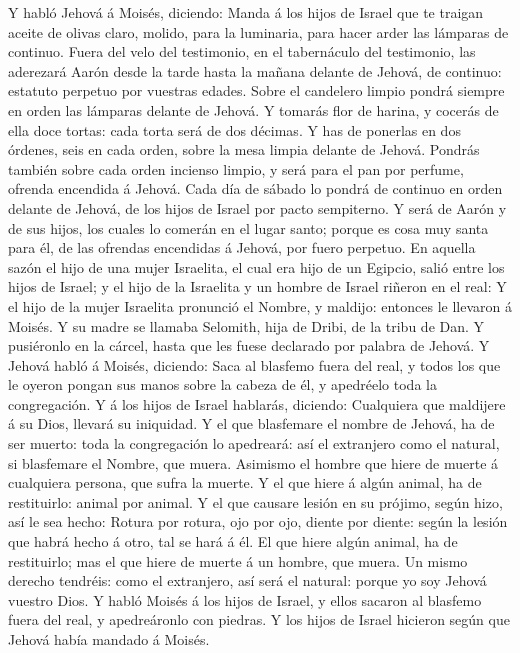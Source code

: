  Y habló Jehová á Moisés, diciendo:  Manda á los
hijos de Israel que te traigan aceite de olivas claro, molido, para la
luminaria, para hacer arder las lámparas de continuo.  Fuera
del velo del testimonio, en el tabernáculo del testimonio, las aderezará
Aarón desde la tarde hasta la mañana delante de Jehová, de continuo:
estatuto perpetuo por vuestras edades.  Sobre el candelero
limpio pondrá siempre en orden las lámparas delante de Jehová.
 Y tomarás flor de harina, y cocerás de ella doce tortas:
cada torta será de dos décimas.  Y has de ponerlas en dos
órdenes, seis en cada orden, sobre la mesa limpia delante de Jehová.
 Pondrás también sobre cada orden incienso limpio, y será
para el pan por perfume, ofrenda encendida á Jehová.  Cada
día de sábado lo pondrá de continuo en orden delante de Jehová, de los
hijos de Israel por pacto sempiterno.  Y será de Aarón y de
sus hijos, los cuales lo comerán en el lugar santo; porque es cosa muy
santa para él, de las ofrendas encendidas á Jehová, por fuero perpetuo.
 En aquella sazón el hijo de una mujer Israelita, el cual
era hijo de un Egipcio, salió entre los hijos de Israel; y el hijo de la
Israelita y un hombre de Israel riñeron en el real:  Y el
hijo de la mujer Israelita pronunció el Nombre, y maldijo: entonces le
llevaron á Moisés. Y su madre se llamaba Selomith, hija de Dribi, de la
tribu de Dan.  Y pusiéronlo en la cárcel, hasta que les
fuese declarado por palabra de Jehová.  Y Jehová habló á
Moisés, diciendo:  Saca al blasfemo fuera del real, y todos
los que le oyeron pongan sus manos sobre la cabeza de él, y apedréelo
toda la congregación.  Y á los hijos de Israel hablarás,
diciendo: Cualquiera que maldijere á su Dios, llevará su iniquidad.
 Y el que blasfemare el nombre de Jehová, ha de ser muerto:
toda la congregación lo apedreará: así el extranjero como el natural, si
blasfemare el Nombre, que muera.  Asimismo el hombre que
hiere de muerte á cualquiera persona, que sufra la muerte. 
Y el que hiere á algún animal, ha de restituirlo: animal por animal.
 Y el que causare lesión en su prójimo, según hizo, así le
sea hecho:  Rotura por rotura, ojo por ojo, diente por
diente: según la lesión que habrá hecho á otro, tal se hará á él.
 El que hiere algún animal, ha de restituirlo; mas el que
hiere de muerte á un hombre, que muera.  Un mismo derecho
tendréis: como el extranjero, así será el natural: porque yo soy Jehová
vuestro Dios.  Y habló Moisés á los hijos de Israel, y
ellos sacaron al blasfemo fuera del real, y apedreáronlo con piedras. Y
los hijos de Israel hicieron según que Jehová había mandado á Moisés.

